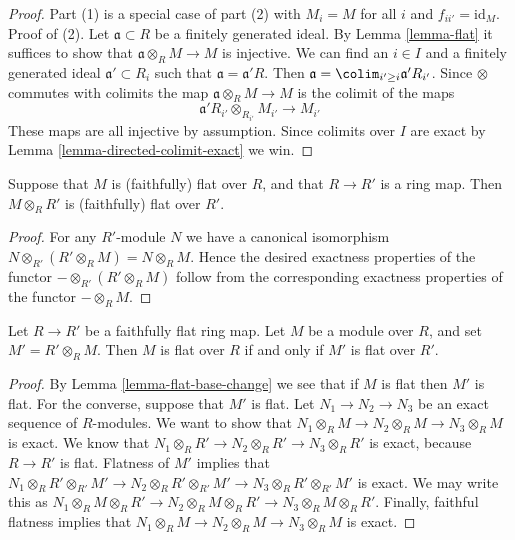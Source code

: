 \begin{proof}
Part (1) is a special case of part (2) with $M_i = M$ for all $i$
and $f_{i i'} = \text{id}_M$. Proof of (2).
Let $\mathfrak a \subset R$ be a finitely generated ideal. By
Lemma \ref{lemma-flat}
it suffices to show that $\mathfrak a \otimes_R M \to M$ is
injective. We can find an $i \in I$ and a finitely generated ideal
$\mathfrak a' \subset R_i$ such that $\mathfrak a = \mathfrak a'R$.
Then $\mathfrak a = \colim_{i' \geq i} \mathfrak a'R_{i'}$.
Since $\otimes$ commutes with colimits the map $\mathfrak a \otimes_R M \to M$
is the colimit of the maps
$$
\mathfrak a'R_{i'} \otimes_{R_{i'}} M_{i'} \longrightarrow M_{i'}
$$
These maps are all injective by assumption. Since colimits over $I$
are exact by Lemma \ref{lemma-directed-colimit-exact} we win.
\end{proof}

\begin{lemma}
\label{lemma-flat-base-change}
Suppose that $M$ is (faithfully) flat over $R$, and that $R \to R'$
is a ring map. Then $M \otimes_R R'$ is (faithfully) flat over $R'$.
\end{lemma}

\begin{proof}
For any $R'$-module $N$ we have a canonical
isomorphism $N \otimes_{R'} (R'\otimes_R M)
= N \otimes_R M$. Hence the desired exactness properties of the functor
$-\otimes_{R'}(R'\otimes_R M)$ follow from
the corresponding exactness properties of the functor $-\otimes_R M$.
\end{proof}

\begin{lemma}
\label{lemma-flatness-descends}
Let $R \to R'$ be a faithfully flat ring map.
Let $M$ be a module over $R$, and set $M' = R' \otimes_R M$.
Then $M$ is flat over $R$ if and only if $M'$ is flat over $R'$.
\end{lemma}

\begin{proof}
By Lemma \ref{lemma-flat-base-change} we see that if $M$ is flat
then $M'$ is flat. For the converse, suppose that $M'$ is flat.
Let $N_1 \to N_2 \to N_3$ be an exact sequence of $R$-modules.
We want to show that $N_1 \otimes_R M \to N_2 \otimes_R M \to N_3 \otimes_R M$
is exact. We know that
$N_1 \otimes_R R' \to N_2 \otimes_R R' \to N_3 \otimes_R R'$ is
exact, because $R \to R'$ is flat. Flatness of $M'$ implies that
$N_1 \otimes_R R' \otimes_{R'} M'
\to N_2 \otimes_R R' \otimes_{R'} M'
\to N_3 \otimes_R R' \otimes_{R'} M'$ is exact.
We may write this as
$N_1 \otimes_R M \otimes_R R'
\to N_2 \otimes_R M \otimes_R R'
\to N_3 \otimes_R M \otimes_R R'$.
Finally, faithful flatness implies that
$N_1 \otimes_R M \to N_2 \otimes_R M \to N_3 \otimes_R M$
is exact.
\end{proof}

